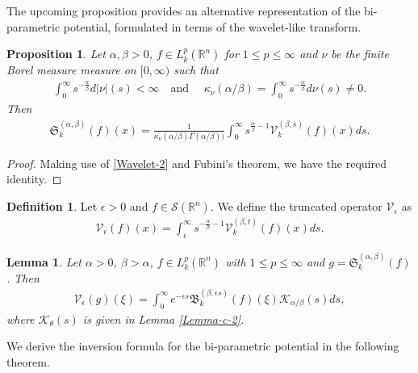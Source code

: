 \documentclass[11pt,a4paper,reqno]{amsproc}
\newtheorem{lemma}[theorem]{Lemma}
\newtheorem{proposition}[theorem]{Proposition}
\theoremstyle{definition}
\newtheorem{definition}[theorem]{Definition}
\theoremstyle{remark}
\numberwithin{equation}{section}
\begin{document}
The upcoming proposition provides an alternative representation of the bi-parametric potential, formulated in terms of the wavelet-like transform.
\begin{proposition} \label{b-potential and V}
    Let $\alpha, \beta >0$, $f \in L_k^p(\mathbb{R}^n)$ for $1\leq p \leq \infty$ and $\nu$ be the finite Borel measure measure on $[0,\infty)$ such that
    \begin{align*}
        \int_0^\infty s^{-\frac{\alpha}{\beta}}d|\nu|(s) < \infty \quad \text{and }\quad  \kappa_\nu(\alpha/\beta) = \int_0^\infty s^{-\frac{\alpha}{\beta}}d\nu(s) \neq 0.
    \end{align*} Then 
    \begin{align*}
        \mathfrak{S}_k^{(\alpha, \beta)}(f)(x) = \frac{1}{\kappa_\nu(\alpha/\beta) \Gamma(\alpha/\beta))}\int_0^\infty s^{\frac{\alpha}{\beta}-1}\mathcal{V}_k^{(\beta,s)}(f)(x) ds.
    \end{align*}
\end{proposition}
\begin{proof}
    Making use of \eqref{Wavelet-2} and Fubini's theorem, we have the required identity.
\end{proof}
\begin{definition}
    Let $\epsilon >0$ and $f\in \mathcal{S}(\mathbb{R}^n)$. We define the truncated operator $\mathcal{V}_{\epsilon}$ as 
    \begin{align*}
        \mathcal{V}_\epsilon (f)(x) = \int_\epsilon ^\infty  s^{-\frac{\alpha}{\beta}-1} \mathcal{V}_k^{(\beta,t)}\left( f\right)(x)ds.
    \end{align*}
\end{definition}
\begin{lemma}\label{Lemma-P-2}
Let $\alpha>0$, $\beta >\alpha $, $f\in L_k^p(\mathbb{R}^n)$ with $1\leq p \leq \infty$ and $g=\mathfrak{S}_k^{(\alpha, \beta)}(f)$. Then
    \begin{align*}
        \mathcal{V}_\epsilon (g)(\xi)= \int_0^\infty e^{-\epsilon s}\mathfrak{B}_k^{(\beta, \epsilon s)}(f)(\xi)\mathcal{K}_{\alpha/\beta}(s)ds,
    \end{align*} where $\mathcal{K}_{\theta}(s)$  is given in Lemma \ref{Lemma-c-2}.
\end{lemma}
We derive the inversion formula for the bi-parametric potential in the following theorem. 
\end{document}
